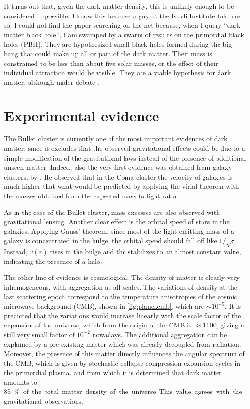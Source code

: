 It turns out that, given the dark matter density, this is unlikely enough to be
considered impossible. I know this because a guy at the Kavli Institute told me
so. I could not find the paper searching on the net because, when I query
``dark matter black hole'', I am swamped by a swarm of results on the
primordial black holes (PBH). They are hypothesized small black holes formed
during the big bang that could make up all or part of the dark matter. Their
mass is constrained to be less than about five solar masses, or the effect of
their individual attraction would be visible. They are a viable hypothesis for
dark matter, although under debate \cite[485]{zyla2020}.

\section{Experimental evidence}

The Bullet cluster is currently one of the most important evidences of dark
matter, since it excludes that the observed gravitational effects could be due
to a simple modification of the gravitational laws instead of the presence of
additional unseen matter. Indeed, also the very first evidence was obtained
from galaxy clusters, by \cite{zwicky1933}. He observed that in the Coma
cluster the velocity of galaxies is much higher that what would be predicted
by applying the virial theorem with the masses obtained from the expected mass
to light ratio.

As in the case of the Bullet cluster, mass excesses are also observed with
gravitational lensing. Another clear effect is the orbital speed of stars in
the galaxies. Applying Gauss' theorem, since most of the light-emitting mass
of a galaxy is concentrated in the bulge, the orbital speed should fall off
like $1/\sqrt r$. Instead, $v(r)$ rises in the bulge and the stabilizes to an
almost constant value, indicating the presence of a halo.

The other line of evidence is cosmological. The density of matter is clearly
very inhomogeneous, with aggregation at all scales. The variations of density
at the last scattering epoch correspond to the temperature anisotropies of the
cosmic microwave background (CMB), shown in \autoref{fig:planckcmb}, which are
$\sim10^{-5}$. It is predicted that the variations would increase linearly with
the scale factor of the expansion of the universe, which from the origin of the
CMB is $\approx1100$, giving a still very small factor of $10^{-2}$ nowadays.
The additional aggregation can be explained by a pre-existing matter which was
already decoupled from radiation. Moreover, the presence of this matter
directly influences the angular spectrum of the CMB, which is given by
stochastic collapse-compression-expansion cycles in the primordial plasma, and
from which it is determined that dark matter amounts to \SI{85}\% of the total
matter density of the universe. This value agrees with the gravitational
observations.

